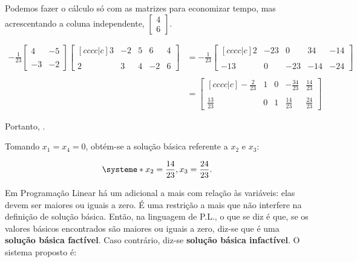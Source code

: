 Podemos fazer o cálculo só com as matrizes para economizar tempo, mas 
acrescentando a coluna independente, $ \begin{bmatrix} 4 \\ 6\end{bmatrix}$.

{\scriptsize
\begin{align*}
  -\frac{1}{23} 
  \begin{bmatrix} 
    4 & -5 \\ 
    &\\
   -3 & -2
  \end{bmatrix} 
  \begin{bmatrix}[cccc|c]
   3 &-2 & 5 &  6 & 4 \\
    &&&&\\
   2 & 3 & 4 & -2 & 6
  \end{bmatrix}
  &=
  -\frac{1}{23}
  \begin{bmatrix}[cccc|c]
     2 & -23 &   0 &  34 & -14 \\
     &&&&\\
   -13 &   0 & -23 & -14 & -24
  \end{bmatrix}\\ \\
  &= 
  \begin{bmatrix}[cccc|c]
   -\frac{2}{23}  & 1 & 0 & -\frac{34}{23} & \frac{14}{23} \\
                  &   &   &                &               \\
    \frac{13}{23} & 0 & 1 &  \frac{14}{23} &\frac{24}{23}
  \end{bmatrix}
\end{align*}
}

Portanto, .

Tomando $ x_1 = x_4 = 0 $, obtém-se a solução básica referente a $ x_2 $ e 
$ x_3 $:

\[
\systeme*{x_2 = \frac{14}{23}, x_3 = \frac{24}{23}}.
\]

Em Programação Linear há um adicional a mais com relação às variáveis: elas 
devem ser maiores ou iguais a zero.
É uma restrição a mais que não interfere na definição de solução básica.
Então, na linguagem  de P.L., o que se diz é que, se os valores básicos 
encontrados são maiores ou iguais a zero, diz-se que é uma 
\textbf{solução básica factível}.
Caso contrário, diz-se \textbf{solução básica infactível}.
O sistema proposto é:

